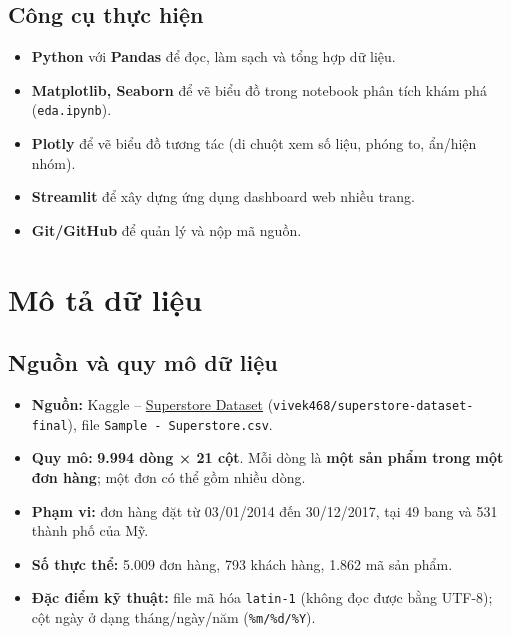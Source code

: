 \documentclass[12pt,a4paper]{article}
\begin{document}
\subsection{Công cụ thực hiện}
\begin{itemize}
  \item \textbf{Python} với \textbf{Pandas} để đọc, làm sạch và tổng hợp dữ liệu.
  \item \textbf{Matplotlib, Seaborn} để vẽ biểu đồ trong notebook phân tích khám phá (\texttt{eda.ipynb}).
  \item \textbf{Plotly} để vẽ biểu đồ tương tác (di chuột xem số liệu, phóng to, ẩn/hiện nhóm).
  \item \textbf{Streamlit} để xây dựng ứng dụng dashboard web nhiều trang.
  \item \textbf{Git/GitHub} để quản lý và nộp mã nguồn.
\end{itemize}

\section{Mô tả dữ liệu}

\subsection{Nguồn và quy mô dữ liệu}
\begin{itemize}
  \item \textbf{Nguồn:} Kaggle – \href{https://www.kaggle.com/datasets/vivek468/superstore-dataset-final}{Superstore Dataset}
        (\texttt{vivek468/superstore-dataset-final}), file \texttt{Sample - Superstore.csv}.
  \item \textbf{Quy mô:} \textbf{9.994 dòng × 21 cột}. Mỗi dòng là \textbf{một sản phẩm trong một đơn hàng};
        một đơn có thể gồm nhiều dòng.
  \item \textbf{Phạm vi:} đơn hàng đặt từ 03/01/2014 đến 30/12/2017, tại 49 bang và 531 thành phố của Mỹ.
  \item \textbf{Số thực thể:} 5.009 đơn hàng, 793 khách hàng, 1.862 mã sản phẩm.
  \item \textbf{Đặc điểm kỹ thuật:} file mã hóa \texttt{latin-1} (không đọc được bằng UTF-8);
        cột ngày ở dạng tháng/ngày/năm (\texttt{\%m/\%d/\%Y}).
\end{itemize}
\end{document}
